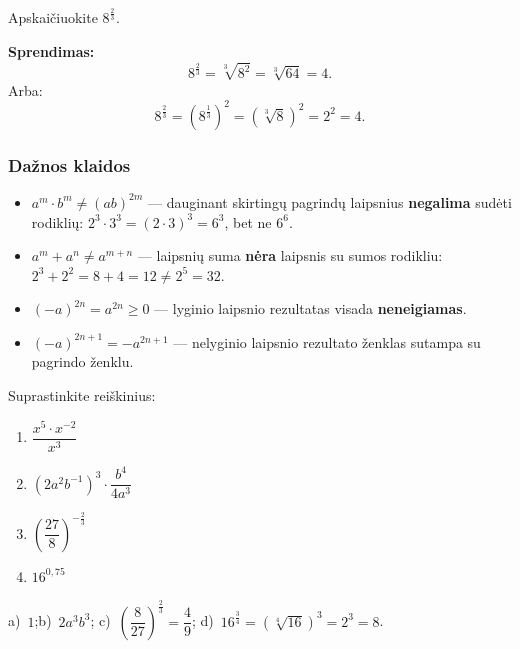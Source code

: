 \begin{example}
Apskaičiuokite $8^{\frac{2}{3}}$.

\medskip
\textbf{Sprendimas:}
\[
    8^{\frac{2}{3}} = \sqrt[3]{8^2} = \sqrt[3]{64} = 4.
\]
Arba:
\[
    8^{\frac{2}{3}} = \left(8^{\frac{1}{3}}\right)^2 = (\sqrt[3]{8})^2 = 2^2 = 4.
\]
\end{example}

\subsubsection*{Dažnos klaidos}

\begin{tcolorbox}[title={Dėmesio! Dažnos klaidos}, colback=red!5!white,
                  colframe=red!60!black]
\begin{itemize}
    \item $a^m \cdot b^m \neq (ab)^{2m}$ — dauginant skirtingų pagrindų
          laipsnius \textbf{negalima} sudėti rodiklių:
          $2^3 \cdot 3^3 = (2 \cdot 3)^3 = 6^3$, bet ne $6^6$.
    \item $a^m + a^n \neq a^{m+n}$ — laipsnių suma \textbf{nėra}
          laipsnis su sumos rodikliu:
          $2^3 + 2^2 = 8 + 4 = 12 \neq 2^5 = 32$.
    \item $(-a)^{2n} = a^{2n} \geq 0$ — lyginio laipsnio rezultatas
          visada \textbf{neneigiamas}.
    \item $(-a)^{2n+1} = -a^{2n+1}$ — nelyginio laipsnio rezultato
          ženklas sutampa su pagrindo ženklu.
\end{itemize}
\end{tcolorbox}

\begin{exercise}
Suprastinkite reiškinius:
\begin{enumerate}[label=\alph*)]
    \item $\dfrac{x^5 \cdot x^{-2}}{x^3}$
    \item $(2a^2b^{-1})^3 \cdot \dfrac{b^4}{4a^3}$
    \item $\left(\dfrac{27}{8}\right)^{-\frac{2}{3}}$
    \item $16^{0{,}75}$
\end{enumerate}
\end{exercise}

\begin{tcolorbox}[title={Atsakymai}, colback=green!5!white,
                  colframe=green!60!black]
a)~$1$;\quad b)~$2a^3b^3$;\quad
c)~$\left(\dfrac{8}{27}\right)^{\frac{2}{3}}
   = \dfrac{4}{9}$;\quad
d)~$16^{\frac{3}{4}} = (\sqrt[4]{16})^3 = 2^3 = 8$.
\end{tcolorbox}

